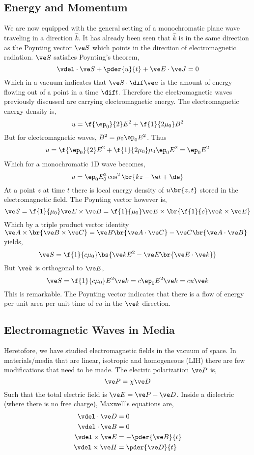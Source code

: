 \documentclass{article}
\begin{document}
\subsection{Energy and Momentum}
We are now equipped with the general setting of a monochromatic plane wave traveling in a direction $\hat k$. It has already been seen that $\hat k$ is in the same direction as the Poynting vector $\ve S$ which points in the direction of electromagnetic radiation. $\ve S$ satisfies Poynting's theorem,
\[ \vdel \cdot \ve S + \pder{u}{t} + \ve E \cdot \ve J = 0 \]
Which in a vacuum indicates that $\ve S \cdot \dif \ve a$ is the amount of energy flowing out of a point in a time $\dif t$. Therefore the electromagnetic waves previously discussed are carrying electromagnetic energy. The electromagnetic energy density is,
\[ u = \f{\ep_0}{2}E^2 + \f{1}{2 \mu_0} B^2 \]
But for electromagnetic waves, $B^2 = \mu_0 \ep_0 E^2$. Thus
\begin{align*}
    u = \f{\ep_0}{2} E^2 + \f{1}{2\mu_0} \mu_0 \ep_0 E^2 = \ep_0 E^2
\end{align*}
Which for a monochromatic 1D wave becomes,
\[  u = \ep_0 E_0^2 \cos^2\br{kz - \w t + \de} \]
At a point $z$ at time $t$ there is local energy density of $u\br{z,t}$ stored in the electromagnetic field. The Poynting vector however is,
\[ \ve S = \f{1}{\mu_0} \ve E \times \ve B = \f{1}{\mu_0} \ve E \times \br{\f{1}{c} \ve k \times \ve E} \]
Which by a triple product vector identity $\ve A \times \br{\ve B \times \ve C} = \ve B \br{\ve A \cdot \ve C} - \ve C \br{\ve A \cdot \ve B}$ yields,
\[ \ve S = \f{1}{c \mu_0} \bs{\ve k E^2 - \ve E \br{\ve E \cdot \ve k}} \]
But $\ve k$ is orthogonal to $\ve E$,
\[ \ve S = \f{1}{c\mu_0} E^2 \ve k = c\ep_0 E^2 \ve k = c u \ve k \]
This is remarkable. The Poynting vector indicates that there is a flow of energy per unit area per unit time of $c u$ in the $\ve k$ direction.

\subsection{Electromagnetic Waves in Media}

Heretofore, we have studied electromagnetic fields in the vacuum of space. In materials/media that are linear, isotropic and homogeneous (LIH) there are few modifications that need to be made. The electric polarization $\ve P$ is,
\[ \ve P = \chi \ve D \]
Such that the total electric field is $\ve E = \ve P + \ve D$. Inside a dielectric (where there is no free charge), Maxwell's equations are,
\begin{align*}
    \vdel \cdot \ve D &= 0 \\
    \vdel \cdot \ve B &= 0 \\
    \vdel \times \ve E &= - \pder{\ve B}{t} \\
    \vdel \times \ve H &= \pder{\ve D}{t}
\end{align*}
\end{document}
